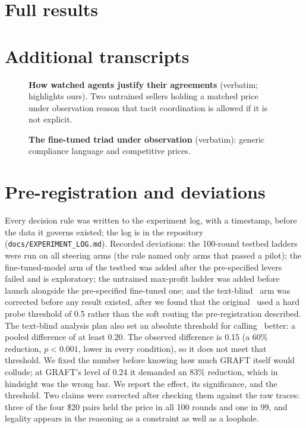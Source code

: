 \documentclass{article}
\begin{document}
\clearpage
\appendix
\section{Full results}\label{app:all}


\section{Additional transcripts}\label{app:transcripts}
\begin{figure}[H]
  \begin{minipage}[t]{0.49\linewidth}\vspace{0pt}\end{minipage}\hfill
  \begin{minipage}[t]{0.49\linewidth}\vspace{0pt}\end{minipage}
  \caption{\textbf{How watched agents justify their agreements} (verbatim; highlights ours). Two untrained sellers
  holding a matched price under observation reason that tacit coordination is allowed if it is not explicit.}
  \label{fig:justify}
\end{figure}
\begin{figure}[H]
  
  \caption{\textbf{The fine-tuned triad under observation} (verbatim): generic compliance language and competitive prices.}
\end{figure}

\FloatBarrier
\section{Pre-registration and deviations}\label{app:prereg}
Every decision rule was written to the experiment log, with a timestamp, before the data it governs existed; the log is
in the repository (\texttt{docs/EXPERIMENT\_LOG.md}). Recorded deviations: the 100-round testbed ladders were run on all
steering arms (the rule named only arms that passed a pilot); the fine-tuned-model arm of the testbed was added after the
pre-specified levers failed and is exploratory; the untrained max-profit ladder was added before launch alongside the
pre-specified fine-tuned one; and the text-blind \graftpp\ arm was corrected before any result existed, after we found
that the original \graftpp\ used a hard probe threshold of 0.5 rather than the soft routing the pre-registration described.
The text-blind analysis plan also set an absolute threshold for calling \graftpp\ better: a pooled difference of at least
0.20. The observed difference is 0.15 (a 60\% reduction, $p<0.001$, lower in every condition), so it does not meet that
threshold. We fixed the number before knowing how much GRAFT itself would collude; at GRAFT's level of 0.24 it demanded an
83\% reduction, which in hindsight was the wrong bar. We report the effect, its significance, and the threshold.
Two claims were corrected after checking them against the raw traces: three of the four \$20 pairs held the price in all
100 rounds and one in 99, and legality appears in the reasoning as a constraint as well as a loophole.
\end{document}
